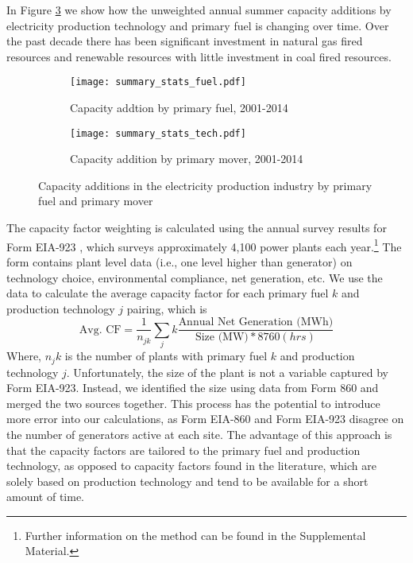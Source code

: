 \documentclass[10pt]{amsart}
\begin{document}
In Figure \ref{fig:techfuelcapacityadds} we show how the unweighted annual summer capacity additions by electricity production technology and primary fuel is changing over time. 
Over the past decade there has been significant investment in natural gas fired resources and renewable resources with little investment in coal fired resources.  

\begin{figure}[!tbp]
\begin{subfigure}[b]{0.4\textwidth}
\texttt{[image: summary\_stats\_fuel.pdf]}
\label{fig:fuelcapacityadds}
\caption{Capacity addtion by primary fuel, 2001-2014}
\end{subfigure}
\hfill
\begin{subfigure}[b]{0.4\textwidth}
\texttt{[image: summary\_stats\_tech.pdf]}
\label{fig:techcapacityadds}
\caption{Capacity addition by primary mover, 2001-2014}
\end{subfigure}
\caption{Capacity additions in the electricity production industry by primary fuel and primary mover \parencite{eiaform860}}
\label{fig:techfuelcapacityadds}
\end{figure}
  
The capacity factor weighting is calculated using the annual survey results for Form EIA-923 \parencite{}, which surveys approximately 4,100 power plants each year.\footnote{Further information on the method can be found in the Supplemental Material.} 
The form contains plant level data (i.e., one level higher than generator) on technology choice, environmental compliance, net generation, etc.
We use the data to calculate the average capacity factor for each primary fuel $k$ and production technology $j$ pairing, which is 
\begin{equation}
\text{Avg. CF} = \frac{1}{n_{jk}} \sum_jk \frac{\text{Annual Net Generation (MWh)}}{\text{Size (MW)}*8760 (hrs)}
\end{equation}
Where, $n_jk$ is the number of plants with primary fuel $k$ and production technology $j$.
Unfortunately, the size of the plant is not a variable captured by Form EIA-923.
Instead, we identified the size using data from Form 860 and merged the two sources together.
This process has the potential to introduce more error into our calculations, as Form EIA-860 and Form EIA-923 disagree on the number of generators active at each site. 
The advantage of this approach is that the capacity factors are tailored to the primary fuel and production technology, as opposed to capacity factors found in the literature, which are solely based on production technology and tend to be available for a short amount of time.
\end{document}
